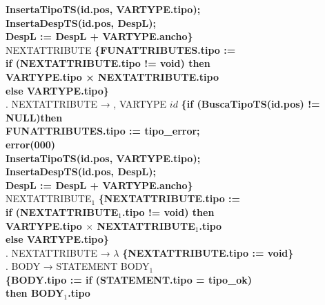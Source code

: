 \begin{tabbing}
    \>              \>          \>    \textbf{InsertaTipoTS(id.pos, VARTYPE.tipo);}\\
    \>                    \>        \>\textbf{InsertaDespTS(id.pos, DespL);}\\
    \>                    \>        \>\textbf{DespL := DespL + VARTYPE.ancho\}}\\
    \>                    \>NEXTATTRIBUTE \textbf{\{FUNATTRIBUTES.tipo :=}\\
    \>                    \>                      \> \textbf{if (NEXTATTRIBUTE.tipo != void) then}\\
    \>                    \>                      \> \>\textbf{VARTYPE.tipo × NEXTATTRIBUTE.tipo}\\
    \>                    \>                      \> \textbf{else VARTYPE.tipo\}}\\
    . NEXTATTRIBUTE → , VARTYPE $id$ \textbf{\{if (BuscaTipoTS(id.pos) != NULL)then} \\
    \>              \>          \>    \>\textbf{FUNATTRIBUTES.tipo := tipo\_error;}\\
    \>              \>          \>    \>\textbf{error(000)}\\
    \>              \>          \>    \textbf{InsertaTipoTS(id.pos, VARTYPE.tipo);}\\
    \>                    \>        \>\textbf{InsertaDespTS(id.pos, DespL);}\\
    \>                    \>        \>\textbf{DespL := DespL + VARTYPE.ancho\}}\\
    \>                    \>NEXTATTRIBUTE$_1$ \textbf{\{NEXTATTRIBUTE.tipo :=}\\
    \>                    \>                      \> \textbf{if (NEXTATTRIBUTE$_1$.tipo != void) then}\\
    \>                    \>                      \> \>\textbf{VARTYPE.tipo $\times$ NEXTATTRIBUTE$_1$.tipo}\\
    \>                    \>                      \> \textbf{else VARTYPE.tipo\}}\\
    . NEXTATTRIBUTE → $\lambda$ \textbf{\{NEXTATTRIBUTE.tipo := void\}}\\
    . BODY → STATEMENT BODY$_1$\\
    \>                    \>\textbf{\{BODY.tipo := if (STATEMENT.tipo = tipo\_ok)}\\
    \>                    \>           \>          \>\textbf{then BODY$_1$.tipo}\\

\end{tabbing}
